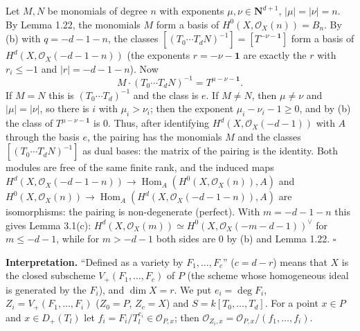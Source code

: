 \documentclass[11pt]{article}
\begin{document}
Let $M,N$ be monomials of degree $n$ with exponents $\mu,\nu\in\mathbf N^{d+1}$, $|\mu|=|\nu|=n$. By Lemma 1.22, the monomials $M$ form a basis of $H^0(X,\mathcal O_X(n))=B_n$. By (b) with $q=-d-1-n$, the classes $[(T_0\cdots T_dN)^{-1}]=[T^{-\nu-\mathbf 1}]$ form a basis of $H^d(X,\mathcal O_X(-d-1-n))$ (the exponents $r=-\nu-\mathbf 1$ are exactly the $r$ with $r_i\le-1$ and $|r|=-d-1-n$). Now
\[ M\cdot(T_0\cdots T_dN)^{-1}=T^{\mu-\nu-\mathbf 1}. \]
If $M=N$ this is $(T_0\cdots T_d)^{-1}$ and the class is $e$. If $M\ne N$, then $\mu\ne\nu$ and $|\mu|=|\nu|$, so there is $i$ with $\mu_i>\nu_i$; then the exponent $\mu_i-\nu_i-1\ge0$, and by (b) the class of $T^{\mu-\nu-\mathbf 1}$ is $0$. Thus, after identifying $H^d(X,\mathcal O_X(-d-1))$ with $A$ through the basis $e$, the pairing has the monomials $M$ and the classes $[(T_0\cdots T_dN)^{-1}]$ as dual bases: the matrix of the pairing is the identity. Both modules are free of the same finite rank, and the induced maps $H^d(X,\mathcal O_X(-d-1-n))\to\operatorname{Hom}_A(H^0(X,\mathcal O_X(n)),A)$ and $H^0(X,\mathcal O_X(n))\to\operatorname{Hom}_A(H^d(X,\mathcal O_X(-d-1-n)),A)$ are isomorphisms: the pairing is non-degenerate (perfect). With $m=-d-1-n$ this gives Lemma 3.1(c): $H^d(X,\mathcal O_X(m))\simeq H^0(X,\mathcal O_X(-m-d-1))^\vee$ for $m\le-d-1$, while for $m>-d-1$ both sides are $0$ by (b) and Lemma 1.22. \hfill$\square$

\pf
\textbf{Interpretation.} ``Defined as a variety by $F_1,\dots,F_c$'' ($c=d-r$) means that $X$ is the closed subscheme $V_+(F_1,\dots,F_c)$ of $P$ (the scheme whose homogeneous ideal is generated by the $F_i$), and $\dim X=r$. We put $e_i=\deg F_i$, $Z_i=V_+(F_1,\dots,F_i)$ ($Z_0=P$, $Z_c=X$) and $S=k[T_0,\dots,T_d]$. For a point $x\in P$ and $x\in D_+(T_l)$ let $f_i=F_i/T_l^{e_i}\in\mathcal O_{P,x}$; then $\mathcal O_{Z_i,x}=\mathcal O_{P,x}/(f_1,\dots,f_i)$.
\end{document}
